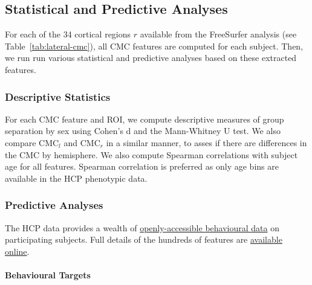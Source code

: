 \documentclass{article}
\begin{document}
\subsection{Statistical and Predictive Analyses}

For each of the 34 cortical regions \(r\) available from the FreeSurfer
analysis (see Table~\ref{tab:lateral-cmc}), all CMC features are
computed for each subject. Then, we run run various statistical and
predictive analyses based on these extracted features.

\subsubsection{Descriptive Statistics}


For each CMC feature and ROI, we compute descriptive measures of group
separation by sex using Cohen's d and the Mann-Whitney U test. We also
compare \(\text{CMC}_l\) and \(\text{CMC}_r\) in a similar manner, to asses
if there are differences in the \(\text{CMC}\) by hemisphere. We also compute
Spearman correlations with subject age for all features. Spearman correlation
is preferred as only age bins are available in the HCP phenotypic data.


%




\subsubsection{Predictive Analyses}

The HCP data provides a wealth of
\href{https://www.humanconnectome.org/study/hcp-young-adult/document/wu-minn-hcp-consortium-open-access-data-use-terms}{openly-accessible
behavioural data} on participating subjects. Full details of the hundreds of
features are
\href{https://wiki.humanconnectome.org/docs/HCP-YA%20Data%20Dictionary-%20Updated%20for%20the%201200%20Subject%20Release.html}{available
online}.

\paragraph{Behavioural Targets} \label{sec:cleaning}
\end{document}
